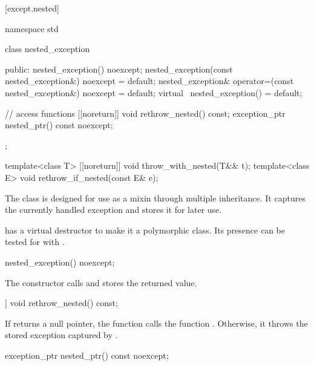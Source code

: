 [except.nested]{}

%
\begin{codeblock}
namespace std {
  class nested_exception {
  public:
    nested_exception() noexcept;
    nested_exception(const nested_exception&) noexcept = default;
    nested_exception& operator=(const nested_exception&) noexcept = default;
    virtual ~nested_exception() = default;

    // access functions
    [[noreturn]] void rethrow_nested() const;
    exception_ptr nested_ptr() const noexcept;
  };

  template<class T> [[noreturn]] void throw_with_nested(T&& t);
  template<class E> void rethrow_if_nested(const E& e);
}
\end{codeblock}

\pnum
The class  is designed for use as a mixin through
multiple inheritance. It captures the currently handled exception and stores it
for later use.

\pnum
\begin{note}  has a virtual destructor to make it a
polymorphic class. Its presence can be tested for with .
\end{note}

%
\begin{itemdecl}
nested_exception() noexcept;
\end{itemdecl}

\begin{itemdescr}
\pnum
\effects The constructor calls  and stores the returned value.
\end{itemdescr}

%
\begin{itemdecl}
[[noreturn]] void rethrow_nested() const;
\end{itemdecl}

\begin{itemdescr}
\pnum
\effects If  returns a null pointer, the function calls the function .
Otherwise, it throws the stored exception captured by .
\end{itemdescr}

%
\begin{itemdecl}
exception_ptr nested_ptr() const noexcept;
\end{itemdecl}

